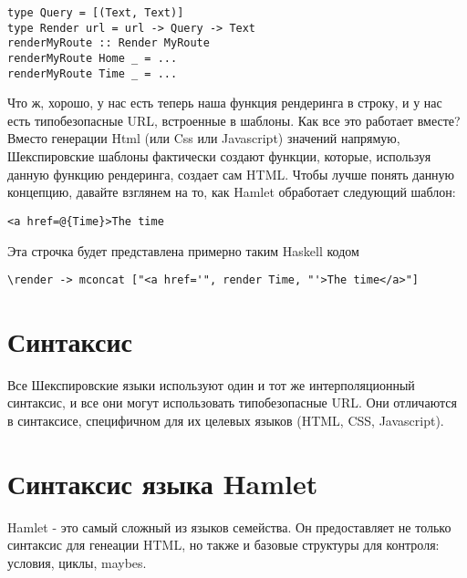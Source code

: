 \begin{lstlisting}
type Query = [(Text, Text)]                                                     
type Render url = url -> Query -> Text                                          
renderMyRoute :: Render MyRoute                                                 
renderMyRoute Home _ = ...                                                      
renderMyRoute Time _ = ...   
\end{lstlisting}

Что ж, хорошо, у нас есть теперь наша функция рендеринга в строку, и у нас есть
типобезопасные URL, встроенные в шаблоны. Как все это работает вместе?
Вместо генерации Html (или Css или Javascript) значений напрямую, 
Шекспировские шаблоны фактически создают функции, которые, используя данную
функцию рендеринга, создает сам HTML. Чтобы лучше понять данную концепцию,
давайте взглянем на то, как Hamlet обработает следующий шаблон:

\begin{lstlisting}
<a href=@{Time}>The time                                                        
\end{lstlisting}
                                                                                
Эта строчка будет представлена примерно таким Haskell кодом 

\begin{lstlisting}
\render -> mconcat ["<a href='", render Time, "'>The time</a>"]     
\end{lstlisting}

\section{Синтаксис}
Все Шекспировские языки используют один и тот же интерполяционный синтаксис, 
и все они могут использовать типобезопасные URL. Они отличаются в синтаксисе,
специфичном для их целевых языков (HTML, CSS, Javascript).

\section{Синтаксис языка Hamlet}
Hamlet - это самый сложный из языков семейства. Он предоставляет не только 
синтаксис для генеации HTML, но также и базовые структуры для контроля: 
условия, циклы, maybes.

